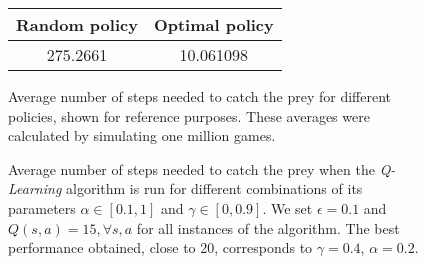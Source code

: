 \documentclass[a4paper,10pt]{article}
\begin{document}
\begin{figure}[ht!]
 \centering
 
 \begin{tabular}{c|c}
  Random policy & Optimal policy \\\hline
  275.2661 & 10.061098 \\
 \end{tabular}
 
 \caption{Average number of steps needed to catch the prey for different policies, shown for reference purposes. These averages were calculated by simulating one million games.}
\label{fig:avg}
\end{figure}

\begin{figure}[ht!]
 \centering
 
 
 \caption{Average number of steps needed to catch the prey when the \textit{Q-Learning} algorithm is run for different combinations of its parameters $\alpha \in [0.1, 1]$ and $\gamma \in [0, 0.9]$. We set $\epsilon = 0.1$ and $Q(s, a) = 15, \forall s, a$ for all instances of the algorithm. The best performance obtained, close to 20, corresponds to $\gamma = 0.4$, $\alpha = 0.2$.}
 \label{fig:test1}
\end{figure}
\end{document}
